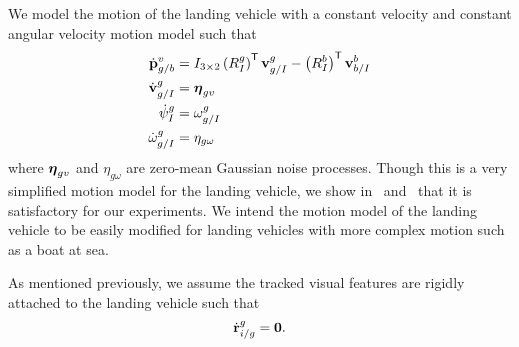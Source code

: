 We model the motion of the landing vehicle
with a constant velocity and constant
angular velocity motion model such that
\begin{align}
  \dot{\boldsymbol{\mathrm{p}}}_{g/b}^{v} &= I_{3 \times 2} \left( R_{I}^{g} \right)^{\mathsf{T}}
   \boldsymbol{\mathrm{v}}_{g/I}^{g} - \left( R_{I}^{b} \right)^{\mathsf{T}}
  \boldsymbol{\mathrm{v}}_{b/I}^{b} \label{eq:goal_dynamics} \\
  \dot{\boldsymbol{\mathrm{v}}}_{g/I}^{g} &= \boldsymbol{\mathrm{\eta}}_{gv} \nonumber \\
  \dot{\psi}_{I}^{g} &= \omega_{g/I}^g \nonumber \\
  \dot{\omega}_{g/I}^{g} &= \eta_{g\omega} \nonumber
\end{align}
where $\boldsymbol{\mathrm{\eta}}_{gv}$ and $\eta_{g\omega}$ are zero-mean Gaussian noise
processes. Though this is a very simplified motion model for the landing
vehicle, we show in~
and~ that it is
satisfactory for our experiments. We intend the motion model of the landing
vehicle to be easily modified for landing vehicles with more complex motion such
as a boat at sea.

As mentioned previously, we assume the tracked visual features are rigidly
attached to the landing vehicle such that
\begin{equation}
  \dot{\boldsymbol{\mathrm{r}}}_{i/g}^g = \boldsymbol{\mathrm{0}}. \label{eq:feature_dynamics}
\end{equation}

